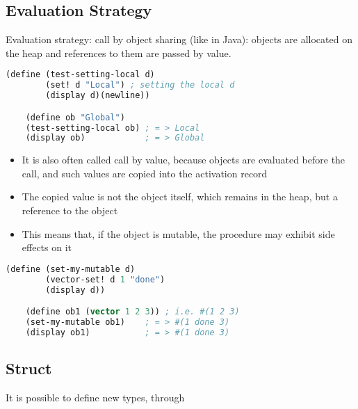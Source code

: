 \subsection{Evaluation Strategy}
Evaluation strategy: call by object sharing (like in Java): objects are allocated on the heap and references to them are passed by value.
\begin{lstlisting}[language=Lisp]
    (define (test-setting-local d)
        (set! d "Local") ; setting the local d
        (display d)(newline))

    (define ob "Global")
    (test-setting-local ob) ; = > Local
    (display ob)            ; = > Global
\end{lstlisting}
\begin{itemize}
    \item It is also often called call by value, because objects are evaluated before the call, and such values are copied into the activation record
    \item The copied value is not the object itself, which remains in the heap, but a reference to the object
    \item This means that, if the object is mutable, the procedure may exhibit side effects on it
\end{itemize}
\begin{lstlisting}[language=Lisp]
    (define (set-my-mutable d)
        (vector-set! d 1 "done")
        (display d))

    (define ob1 (vector 1 2 3)) ; i.e. #(1 2 3)
    (set-my-mutable ob1)    ; = > #(1 done 3)
    (display ob1)           ; = > #(1 done 3)
\end{lstlisting}

\subsection{Struct}
It is possible to define new types, through





